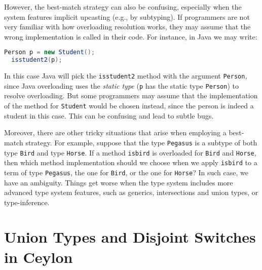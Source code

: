 However, the best-match strategy can also be confusing, especially when the
system features
implicit upcasting (e.g., by subtyping).
If programmers
are not very familiar with how overloading resolution works, they may assume
that the wrong implementation is called in their code. For instance, in Java
we may write:

\begin{lstlisting}[language=Scala]
  Person p = new Student();
  isstudent2(p);
\end{lstlisting}

\noindent In this case Java will pick the \lstinline{isstudent2} method with the
argument \lstinline{Person}, since Java overloading uses the \emph{static type}
(\lstinline{p} has the static type \lstinline{Person})
to resolve overloading. But some programmers may assume that the implementation
of the method for \lstinline{Student} would be chosen instead, since the person
is indeed a student in this case. This can be confusing and lead to subtle bugs.

Moreover, there are other tricky situations
that arise when employing a best-match strategy. For example, suppose
that the type \lstinline{Pegasus} is a subtype of both type \lstinline{Bird} and type
\lstinline{Horse}. If a method \lstinline{isbird} is overloaded for
\lstinline{Bird} and \lstinline{Horse}, then which method implementation should
we choose when we apply \lstinline{isbird} to a term of type
\lstinline{Pegasus}, the one for \lstinline{Bird}, or the one for
\lstinline{Horse}? In such case, we have an ambiguity. Things get worse
when the type system includes more advanced type system features, such as generics,
intersections and union types,
or type-inference.








\section{Union Types and Disjoint Switches in Ceylon}\label{sec:ceylon}


